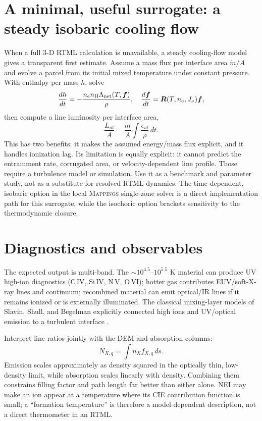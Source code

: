 \documentclass[english,a4paper]{my_memo2}
\newcommand{\nelec}{n_{\rm e}}
\newcommand{\nH}{n_{\rm H}}
\begin{document}
\section{A minimal, useful surrogate: a steady isobaric cooling flow}

When a full 3-D RTML calculation is unavailable, a steady cooling-flow model
gives a transparent first estimate.  Assume a mass flux per interface area
$\dot m/A$ and evolve a parcel from its initial mixed temperature under
constant pressure.  With enthalpy per mass $h$, solve
\begin{equation}
 \frac{dh}{dt}=-\frac{\nelec\nH\Lambda_{\rm net}(T,\boldsymbol f)}{\rho},
 \quad \frac{d\boldsymbol f}{dt}=\boldsymbol R(T,\nelec,J_\nu)\boldsymbol f,
 \label{eq:parcel}
\end{equation}
then compute a line luminosity per interface area,
\begin{equation}
 \frac{L_{ul}}{A}=\frac{\dot m}{A}\int \frac{\epsilon_{ul}}{\rho}\,dt.
 \label{eq:coolflowline}
\end{equation}
This has two benefits: it makes the assumed energy/mass flux explicit, and it
handles ionization lag.  Its limitation is equally explicit: it cannot predict
the entrainment rate, corrugated area, or velocity-dependent line profile.
Those require a turbulence model or simulation.  Use it as a benchmark and
parameter study, not as a substitute for resolved RTML dynamics.  The
time-dependent, isobaric option in the local \textsc{Mappings} single-zone
solver is a direct implementation path for this surrogate, while the
isochoric option brackets sensitivity to the thermodynamic closure.

\section{Diagnostics and observables}

The expected output is multi-band.  The $\sim10^{4.5}$--$10^{5.5}$ K material
can produce UV high-ion diagnostics (C\,IV, Si\,IV, N\,V, O\,VI); hotter gas
contributes EUV/soft-X-ray lines and continuum; recombined material can emit
optical/IR lines if it remains ionized or is externally illuminated.  The
classical mixing-layer models of Slavin, Shull, and Begelman explicitly
connected high ions and UV/optical emission to a turbulent interface
\cite{Slavin1993}.

Interpret line ratios jointly with the DEM and absorption columns:
\begin{equation}
 N_{X,q}=\int n_X f_{X,q}\,ds.
\end{equation}
Emission scales approximately as density squared in the optically thin,
low-density limit, while absorption scales linearly with density.  Combining
them constrains filling factor and path length far better than either alone.
NEI may make an ion appear at a temperature where its CIE contribution
function is small; a ``formation temperature'' is therefore a model-dependent
description, not a direct thermometer in an RTML.
\end{document}

